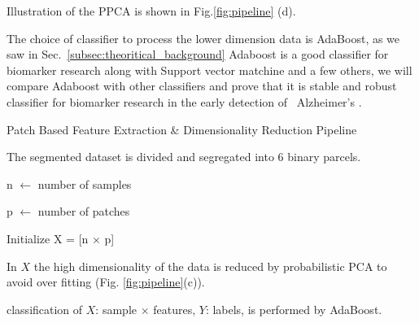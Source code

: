 \documentclass[authoryear,preprint,revi	ew,12pt]{elsarticle}
\newcommand{\Alzheimers} {{Alzheimer\textquoteright s} }
\begin{document}
Illustration of the PPCA is shown in Fig.\ref{fig:pipeline} (d).

The choice of classifier to process the lower dimension data is AdaBoost, as we saw in Sec.~\ref{subsec:theoritical_background} Adaboost is a good classifier for biomarker research along with Support vector matchine and a few others, we will compare Adaboost with other classifiers and prove that it is stable and robust classifier for biomarker research in the early detection of ~\Alzheimers.

\begin{algorithm}
	\vspace{1em}
	\caption{Patch Based Feature Extraction \& Dimensionality Reduction Pipeline}\label{alg:pipeline}
	
	
	
	The segmented dataset is divided and segregated into 6 binary parcels.
	
	 {
		
		n $ \gets $ number of samples
		
		p $ \gets $ number of patches
		
		Initialize X = [n $ \times $ p]
		
		
		In $ X $ the high dimensionality of the data is reduced by probabilistic PCA to avoid over fitting (Fig. \ref{fig:pipeline}(c)).
		
		classification of $ X $: sample $ \times $ features, $ Y $: labels, is performed by AdaBoost. 
	}
\end{algorithm}
\end{document}
